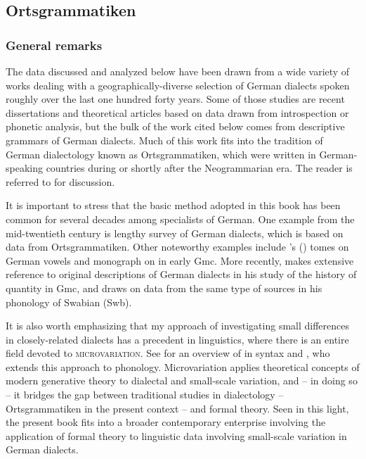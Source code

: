 \subsection{Ortsgrammatiken}\label{sec:1.6.1}
\subsubsection{General remarks}\largerpage[2]

The data discussed and analyzed below have been drawn from a wide variety of works dealing with a geographically-diverse selection of German dialects spoken roughly over the last one hundred forty years. Some of those studies are recent dissertations and theoretical articles based on data drawn from introspection or phonetic analysis, but the bulk of the work cited below comes from descriptive grammars of German dialects. Much of this work fits into the tradition of German dialectology known as Ortsgrammatiken, which were written in German-speaking countries during or shortly after the Neogrammarian era. The reader is referred to \citet{Murray2010} for discussion. 

It is important to stress that the basic method adopted in this book has been common for several decades among specialists of German. One example from the mid-twentieth century is  lengthy survey of German dialects, which is based on data from Ortsgrammatiken. Other noteworthy examples include \citeauthor{Wiesinger}’s (\citeyear{Wiesinger1970a, Wiesinger1970b}) tomes on German vowels and  monograph on  in early Gmc. More recently, \citet{Goblirsch2018} makes extensive reference to original descriptions of German dialects in his study of the history of quantity in Gmc, and \citet{CaroReina2019} draws on data from the same type of sources in his phonology of Swabian (Swb).

It is also worth emphasizing that my approach of investigating small differences in closely-related dialects has a precedent in linguistics, where there is an entire field devoted to \textsc{microvariation}. See \citet{Brandner2012} for an overview of  in syntax and \citet{Alber2014}, who extends this approach to phonology. Microvariation applies theoretical concepts of modern generative theory to dialectal and small-scale variation, and -- in doing so -- it bridges the gap between traditional studies in dialectology -- Ortsgrammatiken in the present context -- and formal theory. Seen in this light, the present book fits into a broader contemporary enterprise involving the application of formal theory to linguistic data involving small-scale variation in German dialects. 


